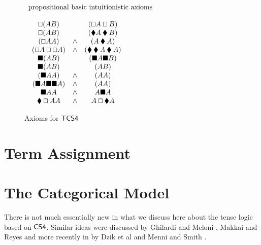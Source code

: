 \documentclass{article}
\let\Diamond\relax
\newcommand{\bLozenge}{\mathbin{\blacklozenge}}
\let\to\relax
\newcommand{\to}{\rightarrow}
\renewcommand{\Box}{\oblong}
\begin{document}
\begin{figure}
  \begin{mdframed}
  \begin{center}
    \begin{math}
      \begin{array}{lll}
        \mbox{propositional basic intuitionistic  axioms}\\\\
        \begin{array}{ccc}          
          \Box (A \to B) &\to &(\Box A \to \Box B)\\
          \Box (A \to B) &\to &(\bLozenge A\to \bLozenge B)\\
          (\Box A\to A) &\land &(A\to \bLozenge A)\\
          (\Box A\to \Box\Box A) &\land &(\bLozenge \bLozenge A \to \bLozenge A)\\
          \blacksquare (A \to B) &\to &(\blacksquare A \to \blacksquare B)\\
          \blacksquare (A \to B) &\to &(\Diamond A\to \Diamond B)\\
          (\blacksquare A\to A) &\land &(A\to \Diamond A)\\
          (\blacksquare A\to \blacksquare\blacksquare A) &\land &(\Diamond \Diamond A \to \Diamond A)\\
          \Diamond \blacksquare A\to A &\land &A\to \blacksquare\Diamond A\\
          \bLozenge\Box A\to A &\land &A\to \Box \bLozenge A\\
        \end{array}
      \end{array}
      \end{math}
  \end{center}
 \end{mdframed}
  \caption{Axioms for $\sf{TCS4}$}
  \label{axiomCS4}
\end{figure}

\section{Term Assignment}
\label{sec:term_assignment}





\section{The Categorical Model}
There is not much essentially new in what we discuss here about the tense logic based on $\sf{CS4}$. Similar ideas were discussed by  Ghilardi and Meloni \cite{ghilardi1988}, Makkai and Reyes \cite{makkai1995} and more recently in by Dzik et al \cite{dziketal2012} and Menni and Smith \cite{Menni:2014}.
\end{document}
